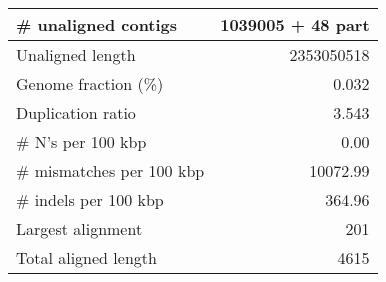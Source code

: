 \documentclass[12pt,a4paper]{article}
\begin{document}
\begin{table}[ht]
\begin{center}
\begin{tabular}{|l*{1}{|r}|}
\# unaligned contigs & 1039005 + 48 part \\ \hline
Unaligned length & 2353050518 \\ \hline
Genome fraction (\%) & 0.032 \\ \hline
Duplication ratio & 3.543 \\ \hline
\# N's per 100 kbp & 0.00 \\ \hline
\# mismatches per 100 kbp & 10072.99 \\ \hline
\# indels per 100 kbp & 364.96 \\ \hline
Largest alignment & 201 \\ \hline
Total aligned length & 4615 \\ \hline
\end{tabular}
\end{center}
\end{table}
\end{document}
